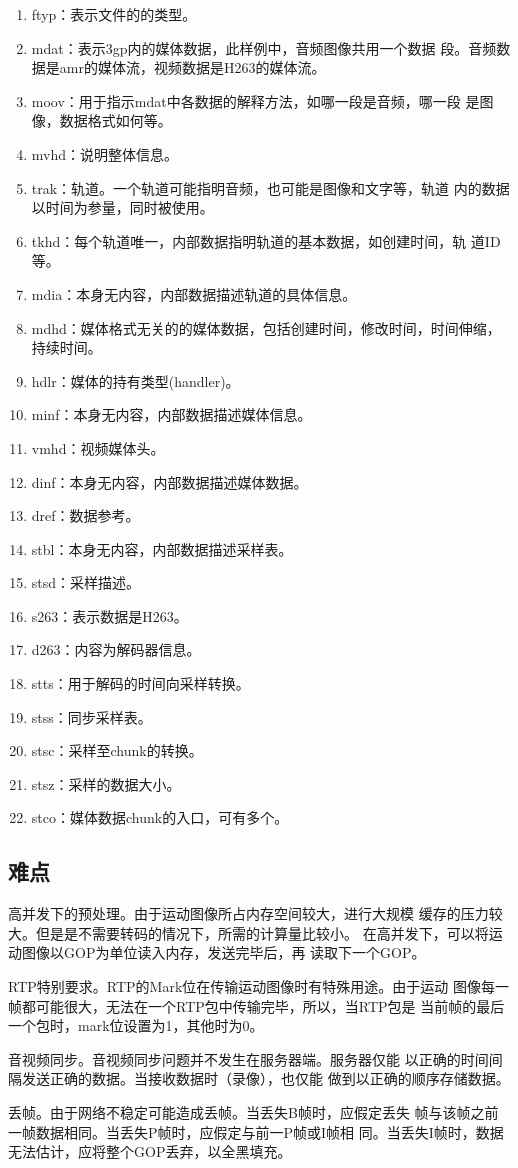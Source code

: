 \documentclass[11pt]{article}
\begin{document}
\begin{enumerate}
    \item ftyp：表示文件的的类型。
    \item mdat：表示3gp内的媒体数据，此样例中，音频图像共用一个数据
        段。音频数据是amr的媒体流，视频数据是H263的媒体流。
    \item moov：用于指示mdat中各数据的解释方法，如哪一段是音频，哪一段
        是图像，数据格式如何等。
    \item mvhd：说明整体信息。
    \item trak：轨道。一个轨道可能指明音频，也可能是图像和文字等，轨道
        内的数据以时间为参量，同时被使用。
    \item tkhd：每个轨道唯一，内部数据指明轨道的基本数据，如创建时间，轨
        道ID等。
    \item mdia：本身无内容，内部数据描述轨道的具体信息。
    \item mdhd：媒体格式无关的的媒体数据，包括创建时间，修改时间，时间伸缩，
        持续时间。
    \item hdlr：媒体的持有类型(handler)。
    \item minf：本身无内容，内部数据描述媒体信息。
    \item vmhd：视频媒体头。
    \item dinf：本身无内容，内部数据描述媒体数据。
    \item dref：数据参考。
    \item stbl：本身无内容，内部数据描述采样表。
    \item stsd：采样描述。
    \item s263：表示数据是H263。
    \item d263：内容为解码器信息。
    \item stts：用于解码的时间向采样转换。
    \item stss：同步采样表。
    \item stsc：采样至chunk的转换。
    \item stsz：采样的数据大小。
    \item stco：媒体数据chunk的入口，可有多个。
\end{enumerate}
    

\subsection{难点}
    高并发下的预处理。由于运动图像所占内存空间较大，进行大规模
缓存的压力较大。但是是不需要转码的情况下，所需的计算量比较小。
在高并发下，可以将运动图像以GOP为单位读入内存，发送完毕后，再
读取下一个GOP。
    
    RTP特别要求。RTP的Mark位在传输运动图像时有特殊用途。由于运动
图像每一帧都可能很大，无法在一个RTP包中传输完毕，所以，当RTP包是
当前帧的最后一个包时，mark位设置为1，其他时为0。
    
    音视频同步。音视频同步问题并不发生在服务器端。服务器仅能
以正确的时间间隔发送正确的数据。当接收数据时（录像），也仅能
做到以正确的顺序存储数据。

    丢帧。由于网络不稳定可能造成丢帧。当丢失B帧时，应假定丢失
帧与该帧之前一帧数据相同。当丢失P帧时，应假定与前一P帧或I帧相
同。当丢失I帧时，数据无法估计，应将整个GOP丢弃，以全黑填充。
\end{document}
